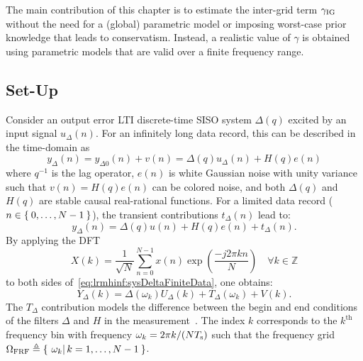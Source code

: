 The main contribution of this chapter is to  estimate the inter-grid term $\gamma_{\mathrm{IG}}$ without the need for a (global) parametric model or imposing worst-case prior knowledge that leads to conservatism.
Instead, a  realistic value of $\gamma$ is obtained using parametric models that are valid over a finite frequency range.

\subsection{Set-Up}
Consider an output error \gls{LTI} discrete-time \gls{SISO} system $\Delta(q)$ excited by an input signal $u_{\Delta}(n)$.
For an infinitely long data record, this can be described in the time-domain as
\begin{equation}
  y_{\Delta}(n) 
    = 
      y_{\Delta0}(n)
      + v(n) 
    = 
      \Delta(q)u_{\Delta}(n) 
      + H(q)e(n)
  \label{eq:lrmhinf:sysDeltaInfData}
\end{equation}
where $q^{-1}$ is the lag operator, $e(n)$ is white Gaussian noise with unity variance such that $v(n) = H(q)e(n)$ can be colored noise, and both $\Delta(q)$ and $H(q)$ are stable causal real-rational functions.
For a limited data record ($n \in \Set{0,\ldots,N-1}$), the transient contributions $t_{\Delta}(n)$ lead to:
\begin{equation}
    y_{\Delta}(n) 
      = 
        \Delta(q)u(n) 
        + H(q)e(n) 
        + t_{\Delta}(n)
    \text{.}
    \label{eq:lrmhinf:sysDeltaFiniteData}
\end{equation}
By applying the \gls{DFT}
\begin{equation}
  X(k) 
       = 
         \frac{1}
              {\sqrt{N}} 
         \sum_{n=0}^{N-1} 
            x(n) \exp \left( \frac{- j 2 \pi k n }{N} \right)
         \quad   
         \forall k \in \mathbb{Z}
  \label{eq:lrmhinf:DFT}
\end{equation} 
to both sides of~\eqref{eq:lrmhinf:sysDeltaFiniteData}, one obtains:
\begin{equation}
  Y_{\Delta}(k) 
                = 
                  \Delta(\omega_k) U_{\Delta}(k) 
                  + T_{\Delta}(\omega_k) 
                  + V(k) 
  \text{.}
  \label{eq:lrmhinf:sysDeltaFiniteDataFD}
\end{equation}
The $T_{\Delta}$ contribution models the difference between the begin and end conditions of the filters $\Delta$ and $H$ in the measurement~\citep{Pintelon1997ARB}.
The index $k$ corresponds to the $k^{\text{th}}$ frequency bin with frequency $\omega_{k} = 2\pi k / (N T_{\mathrm{s}})$ such that the frequency grid $\Omega_{\mathrm{FRF}} \triangleq \Set{\left.\omega_k \right| k = 1,\ldots,N-1}$.

